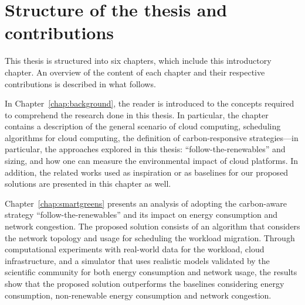 \section{Structure of the thesis and contributions}

This thesis is structured into six chapters, which include this introductory chapter. An overview of the content of each chapter and their respective contributions is described in what follows.

In Chapter~\ref{chap:background}, the reader is introduced to the concepts required to comprehend the research done in this thesis. In particular, the chapter contains a description of the general scenario of cloud computing, scheduling algorithms for cloud computing, the definition of carbon-responsive strategies---in particular, the approaches explored in this thesis: ``follow-the-renewables'' and sizing, and how one can measure the environmental impact of cloud platforms. In addition, the related works used as inspiration or as baselines for our proposed solutions are presented in this chapter as well.

Chapter~\ref{chap:smartgreens} presents an analysis of adopting the carbon-aware strategy ``follow-the-renewables'' and its impact on energy consumption and network congestion. The proposed solution consists of an algorithm that considers the network topology and usage for scheduling the workload migration. Through computational experiments with real-world data for the workload, cloud infrastructure, and a simulator that uses realistic models validated by the scientific community for both energy consumption and network usage, the results show that the proposed solution outperforms the baselines considering energy consumption, non-renewable energy consumption and network congestion.

